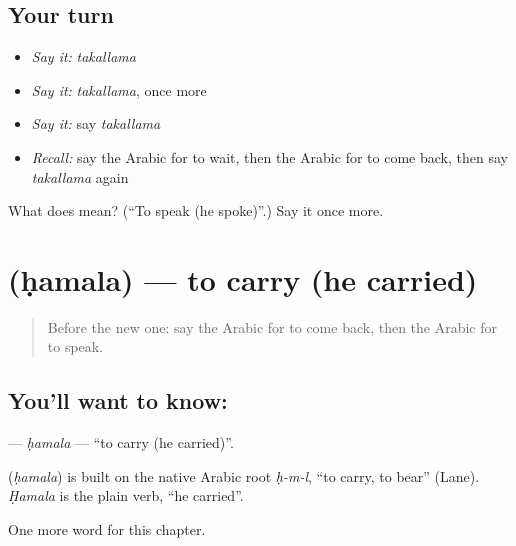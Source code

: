 \subsection*{Your turn}
\begin{itemize}
\raggedright
  \item \emph{Say it:} \emph{takallama}
  \item \emph{Say it:} \emph{takallama}, once more
  \item \emph{Say it:} say \emph{takallama}
  \item \emph{Recall:} say the Arabic for to wait, then the Arabic for to come back, then say \emph{takallama} again
\end{itemize}

\begin{tcolorbox}[breakable,colback=teal!4,colframe=teal!35!black,title={Before you move on}]
What does  mean? (\textquotedblleft{}To speak (he spoke)\textquotedblright{}.) Say it once more.
\end{tcolorbox}
\section[\texorpdfstring{\ar{حمل} (ḥamala)}{حمل (ḥamala)}]{ (ḥamala) — to carry (he carried)}

\label{lesson:AR-C65-hamala}



\begin{quote}
Before the new one: say the Arabic for to come back, then the Arabic for to speak.
\end{quote}

\subsection*{You'll want to know: }
\textbf{} — \emph{ḥamala} — \textquotedblleft{}to carry (he carried)\textquotedblright{}.

\begin{cousinweb}
\textbf{} (\emph{ḥamala}) is built on the native Arabic root \emph{ḥ-m-l}, \textquotedblleft{}to carry, to bear\textquotedblright{} (Lane). \emph{Ḥamala} is the plain verb, \textquotedblleft{}he carried\textquotedblright{}.
\end{cousinweb}

\begin{grammarlens}[title={What you've built}]
One more word for this chapter.
\end{grammarlens}

